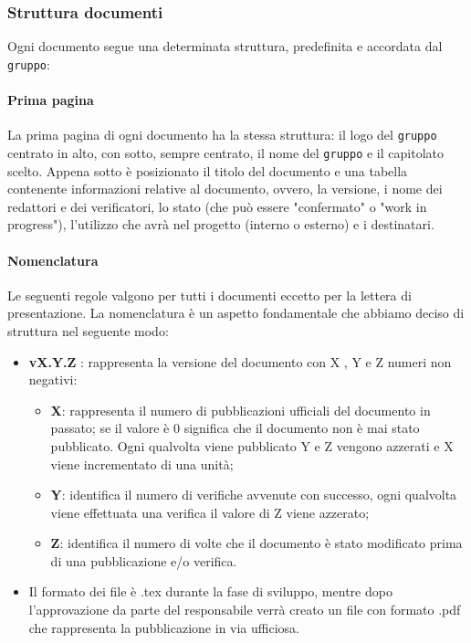 \subsubsection{Struttura documenti}
Ogni documento segue una determinata struttura, predefinita e accordata dal \texttt{gruppo}:

\paragraph{Prima pagina ~\\} 
La prima pagina di ogni documento ha la stessa struttura: il logo del \texttt{gruppo} centrato in alto, con sotto, sempre centrato, il nome del \texttt{gruppo} e il capitolato scelto. Appena sotto è posizionato il titolo del documento e una tabella contenente informazioni relative al documento, ovvero, la versione, i nome dei redattori e dei verificatori, lo stato (che può essere "confermato" o "work in progress"), l'utilizzo che avrà nel progetto (interno o esterno) e i destinatari.

\paragraph{Nomenclatura ~\\}
Le seguenti regole valgono per tutti i documenti eccetto per la lettera di presentazione. La nomenclatura è un aspetto fondamentale che abbiamo deciso di struttura nel seguente modo: 
\begin{itemize}
	\item \textbf{vX.Y.Z }: rappresenta la versione del documento con X , Y e Z numeri non negativi:
	\begin{itemize}
		\item \textbf{X}: rappresenta il numero di pubblicazioni ufficiali del documento in passato; se il valore è 0 significa che il documento non è mai stato pubblicato. Ogni qualvolta viene pubblicato Y e Z vengono azzerati e X viene incrementato di una unità;
		\item \textbf{Y}: identifica il numero di verifiche avvenute con successo, ogni qualvolta viene effettuata una verifica il valore di Z viene azzerato;
		\item \textbf{Z}: identifica il numero di volte che il documento è stato modificato prima di una pubblicazione e/o verifica.
	\end{itemize}
	\item Il formato dei file è .tex durante la fase di sviluppo, mentre dopo l'approvazione da parte del responsabile verrà creato un file con formato .pdf che rappresenta la pubblicazione in via ufficiosa.
\end{itemize}

